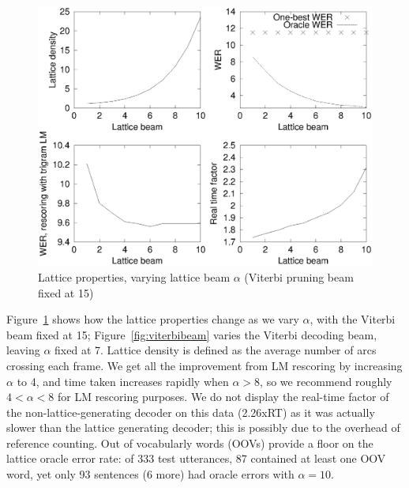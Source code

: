 \documentclass{article}
\begin{document}
\begin{figure}[t]
\centering
   \includegraphics[width=0.9\columnwidth]{figures/latbeam.eps} 
 \vspace*{-0.1in}
 
   \caption{ { Lattice properties, varying lattice beam $\alpha$ (Viterbi pruning beam fixed at 15)} }
  \vspace{-0.15in}
  \label{fig:latbeam}
\end{figure}

Figure~\ref{fig:latbeam} shows how the lattice properties change as we vary
$\alpha$, with the Viterbi beam fixed at 15; Figure~\ref{fig:viterbibeam} varies
the Viterbi decoding beam, leaving $\alpha$ fixed at 7.  Lattice density is
defined as the average number of arcs crossing each frame.  We get all the
improvement from LM rescoring by increasing $\alpha$ to 4, and time taken
increases rapidly when $\alpha > 8$, so we recommend roughly $4 < \alpha < 8$ for
LM rescoring purposes.  We do not display the real-time factor of the
non-lattice-generating decoder on this data (2.26xRT) as it was actually slower
than the lattice generating decoder; this is possibly due to the overhead of
reference counting.  Out of vocabularly words (OOVs) provide a floor on the
lattice oracle error rate: of 333 test utterances, 87 contained at least one OOV
word, yet only 93 sentences (6 more) had oracle errors with $\alpha=10$.
\end{document}
